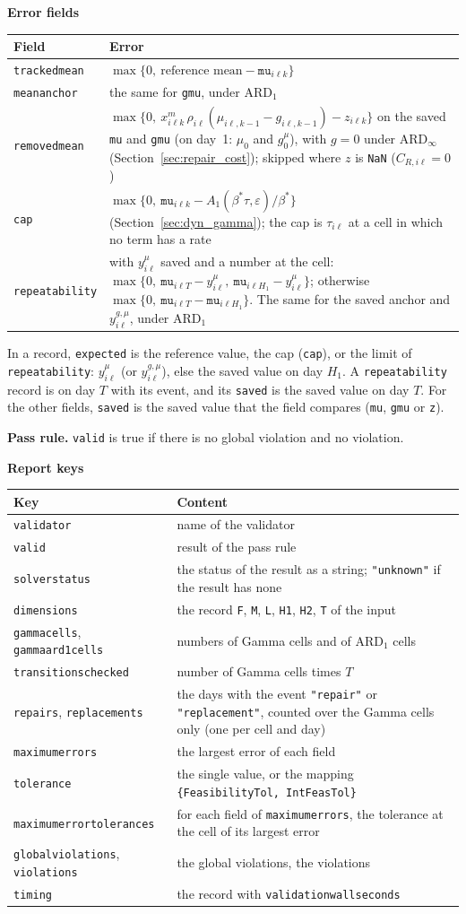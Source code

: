 \documentclass[11pt,a4paper]{article}
\makeatletter
\theoremstyle{plain}
\theoremstyle{definition}
\newcommand{\ARDinf}{\mathrm{ARD}_{\infty}}
\newcommand{\ARDone}{\mathrm{ARD}_{1}}
\newcommand{\blockhead}[1]{\par\noindent\textbf{#1}\par\nobreak}
\renewcommand{\_}{\textunderscore\allowbreak{}}
\providecommand{\rejrow}[2]{{\raggedright #1\par} & {\raggedright #2\par} \\}
\providecommand{\tabstart}[2]{\begingroup\small\begin{longtable}{@{}#1@{}}\toprule #2 \\ \midrule \endhead}
\providecommand{\tabend}{\bottomrule\end{longtable}\endgroup}
\makeatother
\begin{document}
\blockhead{Error fields}
\tabstart{p{3.4cm}p{11.6cm}}{Field & Error}
\rejrow{\texttt{tracked\_mean}}{$\max\{0,\ \text{reference mean} - \texttt{mu}_{i\ell k}\}$}
\rejrow{\texttt{mean\_anchor}}{the same for \texttt{g\_mu}, under $\ARDone$}
\rejrow{\texttt{removed\_mean}}{$\max\{0,\ x^m_{i\ell k}\,\rho_{i\ell}(\mu_{i\ell,k-1} - g_{i\ell,k-1}) - z_{i\ell k}\}$ on the saved \texttt{mu} and \texttt{g\_mu} (on day~1: $\mu_0$ and $g^{\mu}_0$), with $g = 0$ under $\ARDinf$ (Section~\ref{sec:repair_cost}); skipped where $z$ is \texttt{NaN} ($C_{R,i\ell} = 0$)}
\rejrow{\texttt{cap}}{$\max\{0,\ \texttt{mu}_{i\ell k} - A_1(\beta^*\tau,\varepsilon)/\beta^*\}$ (Section~\ref{sec:dyn_gamma}); the cap is $\tau_{i\ell}$ at a cell in which no term has a rate}
\rejrow{\texttt{repeatability}}{with $y^{\mu}_{i\ell}$ saved and a number at the cell: $\max\{0,\ \texttt{mu}_{i\ell T} - y^{\mu}_{i\ell},\ \texttt{mu}_{i\ell H_1} - y^{\mu}_{i\ell}\}$; otherwise $\max\{0,\ \texttt{mu}_{i\ell T} - \texttt{mu}_{i\ell H_1}\}$. The same for the saved anchor and $y^{g,\mu}_{i\ell}$, under $\ARDone$}
\tabend
In a record, \texttt{expected} is the reference value, the cap (\texttt{cap}), or the limit of \texttt{repeatability}: $y^{\mu}_{i\ell}$ (or $y^{g,\mu}_{i\ell}$), else the saved value on day $H_1$. A \texttt{repeatability} record is on day $T$ with its event, and its \texttt{saved} is the saved value on day $T$. For the other fields, \texttt{saved} is the saved value that the field compares (\texttt{mu}, \texttt{g\_mu} or \texttt{z}).

\textbf{Pass rule.} \texttt{valid} is true if there is no global violation and no violation.

\blockhead{Report keys}
\tabstart{p{5.2cm}p{9.8cm}}{Key & Content}
\rejrow{\texttt{validator}}{name of the validator}
\rejrow{\texttt{valid}}{result of the pass rule}
\rejrow{\texttt{solver\_status}}{the status of the result as a string; \texttt{"unknown"} if the result has none}
\rejrow{\texttt{dimensions}}{the record \texttt{F}, \texttt{M}, \texttt{L}, \texttt{H1}, \texttt{H2}, \texttt{T} of the input}
\rejrow{\texttt{gamma\_cells}, \texttt{gamma\_ard1\_cells}}{numbers of Gamma cells and of $\ARDone$ cells}
\rejrow{\texttt{transitions\_checked}}{number of Gamma cells times $T$}
\rejrow{\texttt{repairs}, \texttt{replacements}}{the days with the event \texttt{"repair"} or \texttt{"replacement"}, counted over the Gamma cells only (one per cell and day)}
\rejrow{\texttt{maximum\_errors}}{the largest error of each field}
\rejrow{\texttt{tolerance}}{the single value, or the mapping \texttt{\{FeasibilityTol, IntFeasTol\}}}
\rejrow{\texttt{maximum\_error\_tolerances}}{for each field of \texttt{maximum\_errors}, the tolerance at the cell of its largest error}
\rejrow{\texttt{global\_violations}, \texttt{violations}}{the global violations, the violations}
\rejrow{\texttt{timing}}{the record with \texttt{validation\_wall\_seconds}}
\tabend
\end{document}
